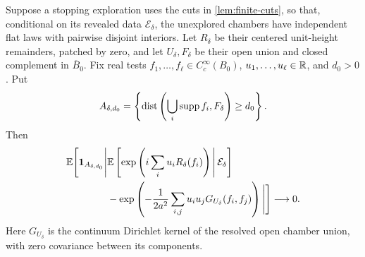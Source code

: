\begin{proposition}
\label{prop:conditional-flat-gff}
Suppose a stopping exploration uses the cuts in \cref{lem:finite-cuts}, so
that, conditional on its revealed data $\mathcal E_\delta$, the unexplored
chambers have independent flat laws with pairwise disjoint interiors. Let
$R_\delta$ be their centered unit-height remainders, patched by zero, and
let $U_\delta,F_\delta$ be their open union and closed complement in
$\overline B_0$. Fix real tests $f_1,\ldots,f_\ell\in C_c^\infty(B_0)$,
$u_1,\ldots,u_\ell\in\mathbb R$, and $d_0>0$. Put
\[
 A_{\delta,d_0}
 =\left\{\operatorname{dist}\left(\bigcup_i\operatorname{supp} f_i,F_\delta\right)\ge d_0\right\}.
\]
Then
\begin{equation}
\begin{split}
 \mathbb E\Bigg[\mathbf 1_{A_{\delta,d_0}}
 \Bigg|&
 \mathbb E\left[\exp\left(i\sum_i u_iR_\delta(f_i)\right)
                  \,\middle|\,\mathcal E_\delta\right]\\
 &-\exp\left(-\frac1{2a^2}
                  \sum_{i,j}u_i u_jG_{U_\delta}(f_i,f_j)\right)
 \Bigg|\Bigg]\longrightarrow0.
\end{split}
\label{eq:conditional-flat-characteristic}
\end{equation}
Here \(G_{U_\delta}\) is the continuum Dirichlet kernel of the resolved
open chamber union, with zero covariance between its components.


\end{proposition}
